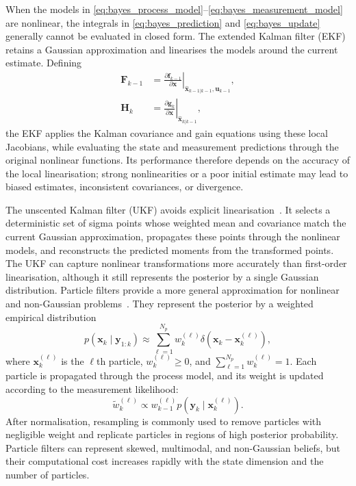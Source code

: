 When the models in \eqref{eq:bayes_process_model}--\eqref{eq:bayes_measurement_model} are nonlinear, the integrals in \eqref{eq:bayes_prediction} and
\eqref{eq:bayes_update} generally cannot be evaluated in closed form.
The extended Kalman filter (EKF) retains a Gaussian approximation and
linearises the models around the current estimate. Defining
\begin{subequations}
\begin{align}
\mathbf{F}_{k-1}
&=
\left.
\frac{\partial\mathbf{f}_{k-1}}
{\partial\mathbf{x}}
\right|_{\widehat{\mathbf{x}}_{k-1|k-1},
\mathbf{u}_{k-1}},
\\
\mathbf{H}_k
&=
\left.
\frac{\partial\mathbf{g}_k}
{\partial\mathbf{x}}
\right|_{\widehat{\mathbf{x}}_{k|k-1}},
\end{align}
\end{subequations}
the EKF applies the Kalman covariance and gain equations using these
local Jacobians, while evaluating the state and measurement predictions
through the original nonlinear functions. Its performance therefore
depends on the accuracy of the local linearisation; strong
nonlinearities or a poor initial estimate may lead to biased estimates,
inconsistent covariances, or divergence.

The unscented Kalman filter (UKF) avoids explicit
linearisation~\cite{julier2004_ukf}. It selects a deterministic set of
sigma points whose weighted mean and covariance match the current
Gaussian approximation, propagates these points through the nonlinear
models, and reconstructs the predicted moments from the transformed
points. The UKF can capture nonlinear transformations more accurately
than first-order linearisation, although it still represents the
posterior by a single Gaussian distribution. Particle filters provide a more general approximation for nonlinear and non-Gaussian problems~\cite{gordon1993_pf,arulampalam2002_pf_tutorial}. They represent the posterior by a weighted empirical distribution
\begin{equation}
p(\mathbf{x}_k\mid\mathbf{y}_{1:k})
\approx
\sum_{\ell=1}^{N_p}
w_k^{(\ell)}
\delta\!\left(
\mathbf{x}_k-\mathbf{x}_k^{(\ell)}
\right),
\label{eq:particle_posterior}
\end{equation}
where $\mathbf{x}_k^{(\ell)}$ is the $\ell$th particle,
$w_k^{(\ell)}\geq 0$, and
$\sum_{\ell=1}^{N_p}w_k^{(\ell)}=1$. Each particle is propagated
through the process model, and its weight is updated according to the
measurement likelihood:
\begin{equation}
\widetilde{w}_k^{(\ell)}
\propto
w_{k-1}^{(\ell)}
p\!\left(
\mathbf{y}_k\mid\mathbf{x}_k^{(\ell)}
\right).
\end{equation}
After normalisation, resampling is commonly used to remove particles
with negligible weight and replicate particles in regions of high
posterior probability. Particle filters can represent skewed,
multimodal, and non-Gaussian beliefs, but their computational cost
increases rapidly with the state dimension and the number of particles.


